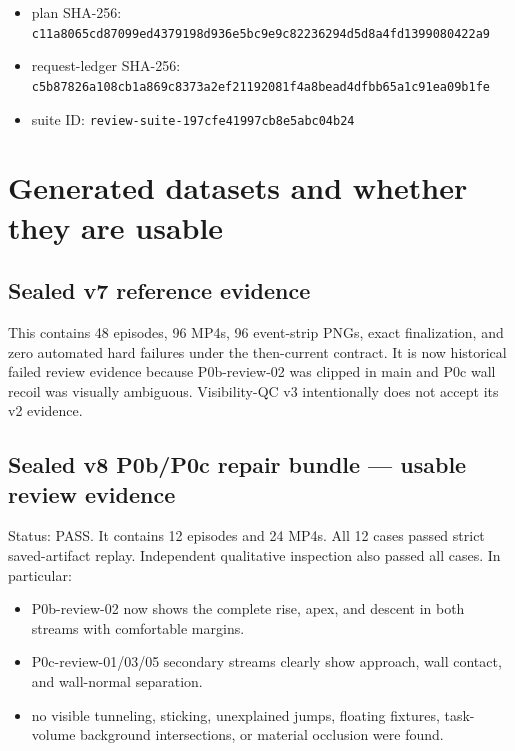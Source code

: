 \documentclass[11pt]{article}
\newcommand{\good}{\textcolor{green!45!black}{PASS}}
\begin{document}
\begin{itemize}
  \item plan SHA-256:
        \texttt{c11a8065cd87099ed4379198d936e5bc9e9c82236294d5d8a4fd1399080422a9}
  \item request-ledger SHA-256:
        \texttt{c5b87826a108cb1a869c8373a2ef21192081f4a8bead4dfbb65a1c91ea09b1fe}
  \item suite ID: \texttt{review-suite-197cfe41997cb8e5abc04b24}
\end{itemize}

\section{Generated datasets and whether they are usable}

\subsection{Sealed v7 reference evidence}


This contains 48 episodes, 96 MP4s, 96 event-strip PNGs, exact finalization,
and zero automated hard failures under the then-current contract.  It is now
historical failed review evidence because P0b-review-02 was clipped in main
and P0c wall recoil was visually ambiguous.  Visibility-QC v3 intentionally
does not accept its v2 evidence.

\subsection{Sealed v8 P0b/P0c repair bundle --- usable review evidence}


Status: \good.  It contains 12 episodes and 24 MP4s.  All 12 cases passed
strict saved-artifact replay.  Independent qualitative inspection also passed
all cases.  In particular:

\begin{itemize}
  \item P0b-review-02 now shows the complete rise, apex, and descent in both
        streams with comfortable margins.
  \item P0c-review-01/03/05 secondary streams clearly show approach, wall
        contact, and wall-normal separation.
  \item no visible tunneling, sticking, unexplained jumps, floating fixtures,
        task-volume background intersections, or material occlusion were found.
\end{itemize}
\end{document}
